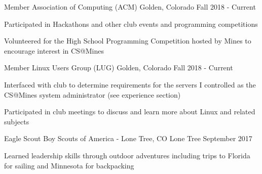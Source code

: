\begin{cventries}
    \ifcv

    \cventry
    {Member}
    {Association of Computing (ACM)}
    {Golden, Colorado}
    {Fall 2018 - Current}
    {
      \begin{cvitems}
        \item Participated in Hackathons and other club events and programming competitions
        \item Volunteered for the High School Programming Competition hosted by Mines to encourage interest in CS@Mines
      \end{cvitems}
    }
    {}

    \cventry
    {Member}
    {Linux Users Group (LUG)}
    {Golden, Colorado}
    {Fall 2018 - Current}
    {
      \begin{cvitems}
        \item Interfaced with club to determine requirements for the servers I controlled as the CS@Mines system administrator (see experience section)
        \item {Participated in club meetings to discuss and learn more about Linux and related subjects}
      \end{cvitems}
    }
    {}

    \cventry
    {Eagle Scout} %
    {Boy Scouts of America - Lone Tree, CO} %
    {Lone Tree} %
    {September 2017} %
    {
      \begin{cvitems} %
        \item {Learned leadership skills through outdoor adventures
            including trips to Florida for sailing and Minnesota for
            backpacking}
      \end{cvitems}
    }
    {}
    \fi

\end{cventries}
